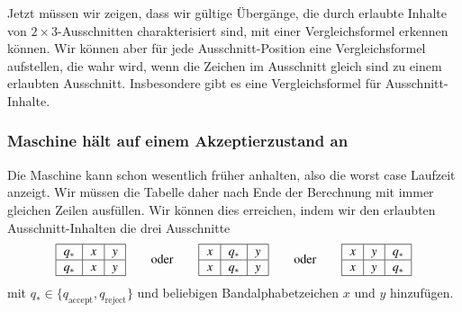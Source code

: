 Jetzt müssen wir zeigen, dass wir gültige Übergänge, die durch erlaubte
Inhalte von $2\times 3$-Ausschnitten charakterisiert sind, mit
einer Vergleichsformel erkennen können.
Wir können aber für jede Ausschnitt-Position eine Vergleichsformel
aufstellen, die wahr wird, wenn die Zeichen im Ausschnitt 
gleich sind zu einem erlaubten Ausschnitt.
Insbesondere gibt es eine Vergleichsformel für Ausschnitt-Inhalte.


\subsubsection{Maschine hält auf einem Akzeptierzustand an}
Die Maschine kann schon wesentlich früher anhalten, also die worst case
Laufzeit anzeigt.
Wir müssen die Tabelle daher nach Ende der Berechnung mit immer gleichen
Zeilen ausfüllen.
Wir können dies erreichen, indem wir den erlaubten Ausschnitt-Inhalten
die drei Ausschnitte
\[
\begin{tabular}{|>{$}c<{$}|>{$}c<{$}|>{$}c<{$}|}
\hline
q_*&x&y\\
\hline
q_*&x&y\\
\hline
\end{tabular}
\qquad\text{oder}\qquad
\begin{tabular}{|>{$}c<{$}|>{$}c<{$}|>{$}c<{$}|}
\hline
x&q_*&y\\
\hline
x&q_*&y\\
\hline
\end{tabular}
\qquad\text{oder}\qquad
\begin{tabular}{|>{$}c<{$}|>{$}c<{$}|>{$}c<{$}|}
\hline
x&y&q_*\\
\hline
x&y&q_*\\
\hline
\end{tabular}
\]
mit $q_*\in\{q_\text{accept},q_\text{reject}\}$ und beliebigen
Bandalphabetzeichen $x$ und $y$ hinzufügen.


